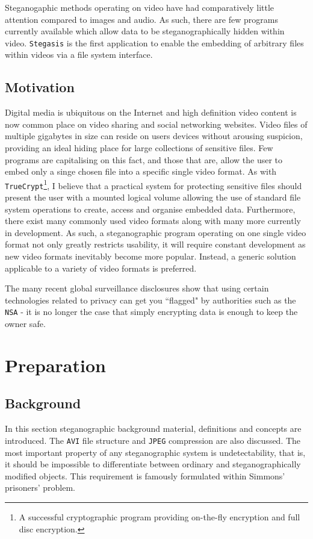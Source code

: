 \documentclass[paper=a4, fontsize=11pt,twoside]{scrartcl}    %
\begin{document}
Steganogaphic methods operating on video have had comparatively little attention compared to images and audio. As such, there are few programs currently available which allow data to be steganographically hidden within video. \texttt{Stegasis} is the first application to enable the embedding of arbitrary files within videos via a file system interface.   



\subsection{Motivation}
Digital media is ubiquitous on the Internet and high definition video content is now common place on video sharing and social networking websites. Video files of multiple gigabytes in size can reside on users devices without arousing suspicion, providing an ideal hiding place for large collections of sensitive files. Few programs are capitalising on this fact, and those that are, allow the user to embed only a singe chosen file into a specific single video format. As with \texttt{TrueCrypt}\footnote{A successful cryptographic program providing on-the-fly encryption and full disc encryption.}, I believe that a practical system for protecting sensitive files should present the user with a mounted logical volume allowing the use of standard file system operations to create, access and organise embedded data. Furthermore, there exist many commonly used video formats along with many more currently in development. As such, a steganographic program operating on one single video format not only greatly restricts usability, it will require constant development as new video formats inevitably become more popular. Instead, a generic solution applicable to a variety of video formats is preferred.

The many recent global surveillance disclosures show that using certain technologies related to privacy can get you ``flagged" by authorities such as the \texttt{NSA} - it is no longer the case that simply encrypting data is enough to keep the owner safe.

\section{Preparation}
\subsection{Background}
In this section steganographic background material, definitions and concepts are introduced. The \texttt{AVI} file structure and \texttt{JPEG} compression are also discussed. The most important property of any steganographic system is undetectability, that is, it should be impossible to differentiate between ordinary and steganographically modified objects. This requirement is famously formulated within Simmons' prisoners' problem. 
\end{document}
